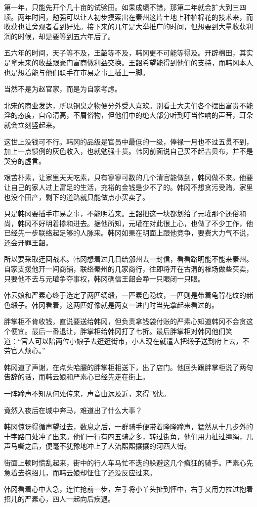 第一年，只能先开个几十亩的试验田。如果成绩不错，那第二年就会扩大到三四顷。两年时间，勉强可以让人初步摸索出在秦州这片土地上种植棉花的技术来，而收获也让旁观者看到好处。接下来的几年是大举推广的时间，但想要到大量收获利润的时候，却是要等到五六年后了。

五六年的时间，天子等不及，王韶等不及，韩冈更不可能等得及。开辟棉田，其实是拿未来的收益跟豪门富商做利益交换。王韶希望能得到他们的支持，而韩冈本人也是想着能与他们联手在市易之事上插上一脚。

当然不是为赵官家，而是为自家考虑。

北宋的商业发达，所以铜臭之物便分外受人喜欢。别看士大夫们各个摆出富贵不能淫的态度，自命清高，不屑俗物，但他们中的绝大部分听到叮当作响的声音，耳朵就会立刻竖起来。

这世上没钱可不行。韩冈的品级是官员中最低的一级，俸禄一月也不过五贯不到，加上一点惯例的灰色收入，也就勉强十贯。韩冈前面说自己买不起吉贝布，并不是哭穷的虚言。

艰苦朴素，让家里天天吃素，只有寥寥可数的几个清官能做到，韩冈做不来。他要让自己的家人过上富足的生活，充裕的金钱是少不了的。韩冈不想贪污受贿，家里也没个田产，剩下的道路就只能做点小买卖了。

只是韩冈要插手市易之事，不能明着来。王韶把这一块都划给了元瓘那个还俗和尚，韩冈不好明着掺和进去。据他所知，元瓘在对此很上心，也做了不少工作，他已经先一步联络起足够的人脉来。韩冈如果在明面上跟他竞争，要费大力气不说，还会开罪王韶。

所以要采取迂回战术。韩冈想着过几日给邠州去一封信，看看路明能不能来秦州。自家支援他开一间商铺，联络秦州的几家商行，往即将开在古渭的榷场做些买卖，只要他不去与元瓘争夺事权，韩冈确信王韶会睁一只眼闭一只眼。

韩云娘和严素心终于选定了两匹绸缎，一匹素色隐纹，一匹则是带着龟背花纹的赭色缎子。韩冈看着，这两匹好像就是两女一进门时当先拿起来看过的。

胖掌柜不肯收钱，直说要送给韩冈，但负责拿钱袋付账的严素心知道韩冈不会贪这个便宜。最后一番退让，胖掌柜给韩冈打了七折。最后胖掌柜对韩冈他们笑道：“官人可以陪两位小娘子去逛逛街市，小人现在就遣人把缎子送到府上去，不劳官人烦心。”

韩冈道了声谢，在点头哈腰的胖掌柜相送下，出了店门。他回头跟胖掌柜说了两句告辞的话，而韩云娘和严素心已经先走在街上。

一阵蹄声不知从何处传来，声音由远及近，来得飞快。

竟然入夜后在城中奔马，难道出了什么大事？

韩冈惊讶得循声望过去，数息之后，一群骑手便带着隆隆蹄声，猛然从十几步外的十字路口处冲了出来。他们一行有四五骑之多，转过街角，他们用力扯过缰绳，几声马嘶之后，便毫不犹豫地冲上了人流熙熙攘攘的河西大街。

街面上顿时慌乱起来，街中的行人车马忙不迭的躲避这几个疯狂的骑手。严素心先急着去抱招儿，而韩云娘却怔住了还没反应过来。

韩冈看着心中大急，连忙抢前一步，左手将小丫头扯到怀中，右手又用力拉过抱着招儿的严素心，四人一起向后疾退。

